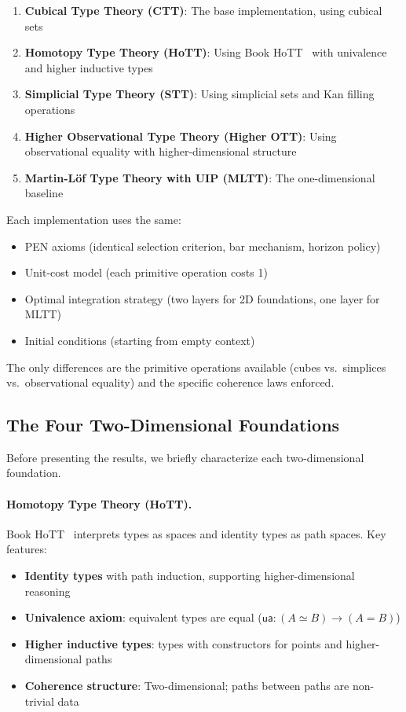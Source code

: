 \documentclass[11pt]{article}
\theoremstyle{definition}
\theoremstyle{remark}
\begin{document}
\begin{enumerate}
\item \textbf{Cubical Type Theory (CTT)}: The base implementation, using cubical sets~\cite{cohen2018cubical}
\item \textbf{Homotopy Type Theory (HoTT)}: Using Book HoTT~\cite{hott-book} with univalence and higher inductive types
\item \textbf{Simplicial Type Theory (STT)}: Using simplicial sets and Kan filling operations~\cite{riehl2017type}
\item \textbf{Higher Observational Type Theory (Higher OTT)}: Using observational equality with higher-dimensional structure~\cite{altenkirch2007observational}
\item \textbf{Martin-Löf Type Theory with UIP (MLTT)}: The one-dimensional baseline
\end{enumerate}

Each implementation uses the same:
\begin{itemize}
\item PEN axioms (identical selection criterion, bar mechanism, horizon policy)
\item Unit-cost model (each primitive operation costs 1)
\item Optimal integration strategy (two layers for 2D foundations, one layer for MLTT)
\item Initial conditions (starting from empty context)
\end{itemize}

The only differences are the primitive operations available (cubes vs.\ simplices vs.\ observational equality) and the specific coherence laws enforced.

\subsection{The Four Two-Dimensional Foundations}

Before presenting the results, we briefly characterize each two-dimensional foundation.

\paragraph{Homotopy Type Theory (HoTT).}

Book HoTT~\cite{hott-book} interprets types as spaces and identity types as path spaces. Key features:
\begin{itemize}
\item \textbf{Identity types} with path induction, supporting higher-dimensional reasoning
\item \textbf{Univalence axiom}: equivalent types are equal ($\mathsf{ua} : (A \simeq B) \to (A = B)$)
\item \textbf{Higher inductive types}: types with constructors for points and higher-dimensional paths
\item \textbf{Coherence structure}: Two-dimensional; paths between paths are non-trivial data
\end{itemize}
\end{document}

